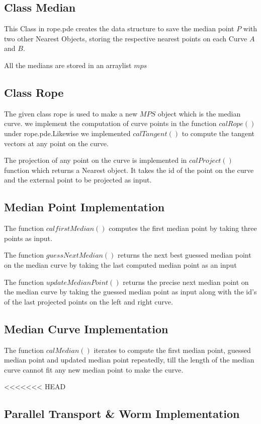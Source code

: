 \documentclass[twoside,11pt]{article}
\begin{document}
\subsection{Class Median}
This Class in rope.pde creates the data structure to save the median point $P$ with two other Nearest Objects, storing the respective nearest points on each Curve $A$ and $B$. 

All the medians are stored in an arraylist $mps$

\subsection{Class Rope}
The given class rope is used to make a new $MPS$ object which is the median curve. we implement the computation of curve points in the function $calRope()$ under rope.pde.Likewise we implemented $calTangent()$ to compute the tangent vectors at any point on the curve.

The projection of any point on the curve is implemented in $calProject()$ function which returns a Nearest object. It takes the id of the point on the curve and the external point to be projected as input.

\subsection{Median Point Implementation}
The function $calfirstMedian()$ computes the first median point by taking three points as input.

The function $guessNextMedian()$ returns the next best guessed median point on the median curve by taking the last computed median point as an input

The function $updateMedianPoint()$ returns the precise next median point on the median curve by taking the guessed median point as input along with the id's of the last projected points on the left and right curve.


\subsection{Median Curve Implementation}

The function $calMedian()$ iterates to compute the first median point, guessed median point and updated median point repeatedly, till the length of the median curve cannot fit any new median point to make the curve.

<<<<<<< HEAD
\subsection{Parallel Transport & Worm Implementation}
\end{document}
